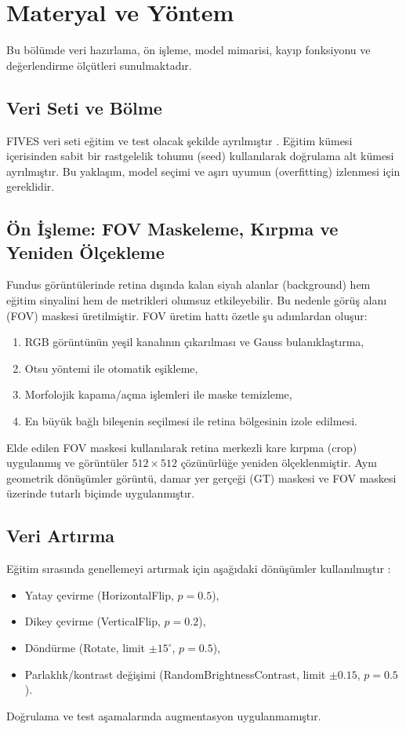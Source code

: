 \section{Materyal ve Yöntem}
Bu bölümde veri hazırlama, ön işleme, model mimarisi, kayıp fonksiyonu ve değerlendirme ölçütleri sunulmaktadır.

\subsection{Veri Seti ve Bölme}
FIVES veri seti eğitim ve test olacak şekilde ayrılmıştır \cite{jin2022fives}. Eğitim kümesi içerisinden sabit bir rastgelelik tohumu (seed) kullanılarak doğrulama alt kümesi ayrılmıştır. Bu yaklaşım, model seçimi ve aşırı uyumun (overfitting) izlenmesi için gereklidir.

\subsection{Ön İşleme: FOV Maskeleme, Kırpma ve Yeniden Ölçekleme}
Fundus görüntülerinde retina dışında kalan siyah alanlar (background) hem eğitim sinyalini hem de metrikleri olumsuz etkileyebilir. Bu nedenle görüş alanı (FOV) maskesi üretilmiştir. FOV üretim hattı özetle şu adımlardan oluşur:
\begin{enumerate}
    \item RGB görüntünün yeşil kanalının çıkarılması ve Gauss bulanıklaştırma,
    \item Otsu yöntemi ile otomatik eşikleme,
    \item Morfolojik kapama/açma işlemleri ile maske temizleme,
    \item En büyük bağlı bileşenin seçilmesi ile retina bölgesinin izole edilmesi.
\end{enumerate}
Elde edilen FOV maskesi kullanılarak retina merkezli kare kırpma (crop) uygulanmış ve görüntüler $512\times512$ çözünürlüğe yeniden ölçeklenmiştir. Aynı geometrik dönüşümler görüntü, damar yer gerçeği (GT) maskesi ve FOV maskesi üzerinde tutarlı biçimde uygulanmıştır.

\subsection{Veri Artırma}
Eğitim sırasında genellemeyi artırmak için aşağıdaki dönüşümler kullanılmıştır \cite{buslaev2020albumentations}:
\begin{itemize}
    \item Yatay çevirme (HorizontalFlip, $p=0.5$),
    \item Dikey çevirme (VerticalFlip, $p=0.2$),
    \item Döndürme (Rotate, limit $\pm 15^\circ$, $p=0.5$),
    \item Parlaklık/kontrast değişimi (RandomBrightnessContrast, limit $\pm 0.15$, $p=0.5$).
\end{itemize}
Doğrulama ve test aşamalarında augmentasyon uygulanmamıştır.

